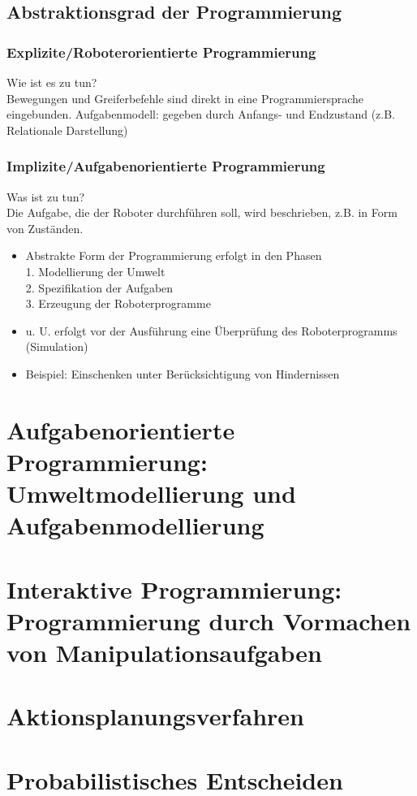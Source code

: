 \documentclass[11pt]{scrartcl}
\begin{document}
\subsection{Abstraktionsgrad der Programmierung}
\subsubsection{Explizite/Roboterorientierte Programmierung}
\glqq Wie ist es zu tun?\grqq \\
Bewegungen und Greiferbefehle sind direkt in eine Programmiersprache eingebunden.
Aufgabenmodell: gegeben durch Anfangs- und Endzustand (z.B. Relationale Darstellung)
\subsubsection{Implizite/Aufgabenorientierte Programmierung}
\glqq Was ist zu tun?\grqq \\
Die Aufgabe, die der Roboter durchführen soll, wird beschrieben, z.B. in Form von Zuständen.
\begin{itemize}
\item Abstrakte Form der Programmierung erfolgt in den Phasen\\
1. Modellierung der Umwelt\\
2. Spezifikation der Aufgaben\\
3. Erzeugung der Roboterprogramme
\item u. U. erfolgt vor der Ausführung eine Überprüfung des
Roboterprogramms (Simulation)
\item Beispiel: Einschenken unter Berücksichtigung von Hindernissen
\end{itemize}
\section{Aufgabenorientierte Programmierung: Umweltmodellierung und Aufgabenmodellierung} %
\section{Interaktive Programmierung: Programmierung durch Vormachen von Manipulationsaufgaben} %
\section{Aktionsplanungsverfahren} %
\section{Probabilistisches Entscheiden} %
\end{document}
